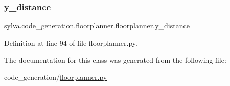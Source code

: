 \subsubsection{\texorpdfstring{y\+\_\+distance}{y\_distance}}
{\footnotesize\ttfamily sylva.\+code\+\_\+generation.\+floorplanner.\+floorplanner.\+y\+\_\+distance}



Definition at line 94 of file floorplanner.\+py.



The documentation for this class was generated from the following file\+:\begin{DoxyCompactItemize}
\item 
code\+\_\+generation/\hyperlink{floorplanner_8py}{floorplanner.\+py}\end{DoxyCompactItemize}
